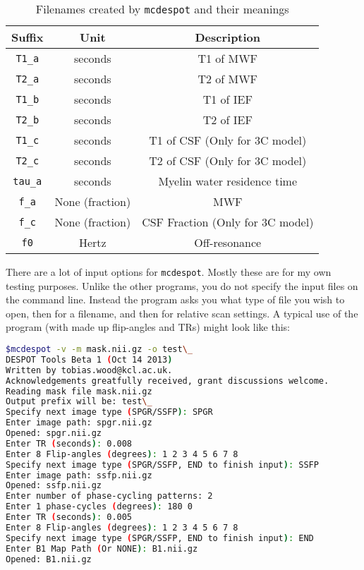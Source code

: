 \documentclass{report}
\begin{document}
\begin{table}\begin{center}
\begin{tabular}{c c c}
\hline
Suffix	& Unit	& Description\\
\hline
\texttt{T1\_a}	& seconds & T1 of MWF \\
\texttt{T2\_a}	& seconds & T2 of MWF \\
\texttt{T1\_b}	& seconds & T1 of IEF \\
\texttt{T2\_b}	& seconds & T2 of IEF \\
\texttt{T1\_c}	& seconds & T1 of CSF (Only for 3C model) \\
\texttt{T2\_c}	& seconds & T2 of CSF (Only for 3C model) \\
\texttt{tau\_a}	& seconds & Myelin water residence time \\
\texttt{f\_a}	& None (fraction) & MWF \\
\texttt{f\_c}	& None (fraction) & CSF Fraction (Only for 3C model) \\
\texttt{f0}		& Hertz  & Off-resonance \\
\hline
\end{tabular}
\caption{Filenames created by \texttt{mcdespot} and their meanings}
\label{mcdespotfilenames}
\end{center}\end{table}	

There are a lot of input options for \texttt{mcdespot}. Mostly these are for my own testing purposes. Unlike the other programs, you do not specify the input files on the command line. Instead the program asks you what type of file you wish to open, then for a filename, and then for relative scan settings. A typical use of the program (with made up flip-angles and TRs) might look like this:

\begin{lstlisting}[language=sh]
$mcdespot -v -m mask.nii.gz -o test\_
DESPOT Tools Beta 1 (Oct 14 2013)
Written by tobias.wood@kcl.ac.uk. 
Acknowledgements greatfully received, grant discussions welcome.
Reading mask file mask.nii.gz
Output prefix will be: test\_
Specify next image type (SPGR/SSFP): SPGR
Enter image path: spgr.nii.gz
Opened: spgr.nii.gz
Enter TR (seconds): 0.008
Enter 8 Flip-angles (degrees): 1 2 3 4 5 6 7 8
Specify next image type (SPGR/SSFP, END to finish input): SSFP
Enter image path: ssfp.nii.gz
Opened: ssfp.nii.gz
Enter number of phase-cycling patterns: 2
Enter 1 phase-cycles (degrees): 180 0
Enter TR (seconds): 0.005
Enter 8 Flip-angles (degrees): 1 2 3 4 5 6 7 8
Specify next image type (SPGR/SSFP, END to finish input): END
Enter B1 Map Path (Or NONE): B1.nii.gz
Opened: B1.nii.gz
\end{lstlisting}
\end{document}
